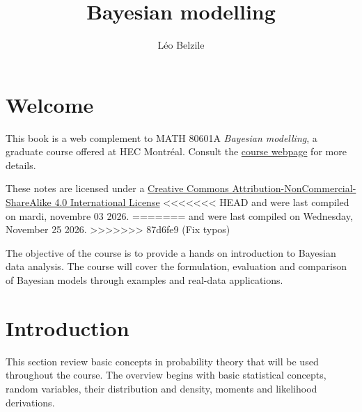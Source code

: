 \documentclass[
  11pt,
  letterpaper,
]{scrbook}
\title{Bayesian modelling}
\author{Léo Belzile}
\date{}
\renewcommand*\contentsname{Table of contents}
\newcommand\contentsname{Table of contents}
\theoremstyle{definition}
\theoremstyle{plain}
\theoremstyle{plain}
\theoremstyle{plain}
\theoremstyle{definition}
\theoremstyle{definition}
\theoremstyle{plain}
\theoremstyle{plain}
\theoremstyle{remark}
\begin{document}
\frontmatter
\maketitle

\renewcommand*\contentsname{Table of contents}
{
\setcounter{tocdepth}{2}
\tableofcontents
}

\mainmatter
{}

\chapter*{Welcome}\label{welcome}


This book is a web complement to MATH 80601A \emph{Bayesian modelling},
a graduate course offered at HEC Montréal. Consult the
\href{https://lbelzile.github.io/bayesmod}{course webpage} for more
details.

These notes are licensed under a
\href{http://creativecommons.org/licenses/by-nc-sa/4.0/}{Creative
Commons Attribution-NonCommercial-ShareAlike 4.0 International License}
<<<<<<< HEAD
and were last compiled on mardi, novembre 03 2026.
=======
and were last compiled on Wednesday, November 25 2026.
>>>>>>> 87d6fe9 (Fix typos)

The objective of the course is to provide a hands on introduction to
Bayesian data analysis. The course will cover the formulation,
evaluation and comparison of Bayesian models through examples and
real-data applications.


\chapter{Introduction}\label{introduction}

This section review basic concepts in probability theory that will be
used throughout the course. The overview begins with basic statistical
concepts, random variables, their distribution and density, moments and
likelihood derivations.
\end{document}
